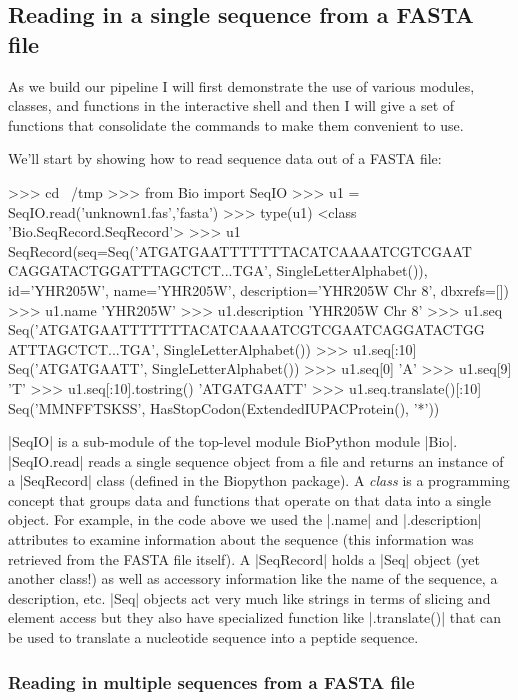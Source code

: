 \subsection{Reading in a single sequence from a FASTA file}

As we build our pipeline I will first demonstrate the use of various modules, classes, and functions in the interactive shell and then I will give a set of functions that consolidate the commands to make them convenient to use.  

We'll start by showing how to read sequence data out of a FASTA file:
\begin{python}
>>> cd ~/tmp
>>> from Bio import SeqIO
>>> u1 = SeqIO.read('unknown1.fas','fasta')
>>> type(u1)
<class 'Bio.SeqRecord.SeqRecord'>
>>> u1
SeqRecord(seq=Seq('ATGATGAATTTTTTTACATCAAAATCGTCGAAT
CAGGATACTGGATTTAGCTCT...TGA', SingleLetterAlphabet()), 
id='YHR205W', name='YHR205W', description='YHR205W  Chr 8', dbxrefs=[])
>>> u1.name
'YHR205W'
>>> u1.description
'YHR205W  Chr 8'
>>> u1.seq
Seq('ATGATGAATTTTTTTACATCAAAATCGTCGAATCAGGATACTGG
ATTTAGCTCT...TGA', SingleLetterAlphabet())
>>> u1.seq[:10]
Seq('ATGATGAATT', SingleLetterAlphabet())
>>> u1.seq[0]
'A'
>>> u1.seq[9]
'T'
>>> u1.seq[:10].tostring()
'ATGATGAATT'
>>> u1.seq.translate()[:10]
Seq('MMNFFTSKSS', HasStopCodon(ExtendedIUPACProtein(), '*'))
\end{python}

|SeqIO| is a sub-module of the top-level module BioPython module |Bio|.  |SeqIO.read| reads a single sequence object from a file and returns an instance of a |SeqRecord| class (defined in the Biopython package). A \emph{class} is a programming concept that groups data and functions that operate on that data into a single object. For example, in the code above we used the |.name| and |.description| attributes to examine information about the sequence (this information was retrieved from the FASTA file itself).  A |SeqRecord| holds a |Seq| object (yet another class!) as well as accessory information like the name of the sequence, a description, etc. |Seq| objects act very much like strings in terms of slicing and element access but they also have specialized function like |.translate()| that can be used to translate a nucleotide sequence into a peptide sequence. 

\subsubsection{Reading in multiple sequences from a FASTA file}

